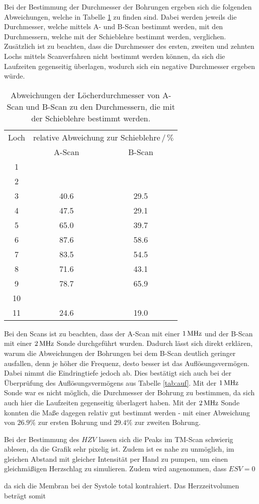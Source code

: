 Bei der Bestimmung der Durchmesser der Bohrungen ergeben sich die folgenden
Abweichungen, welche in Tabelle \ref{tab:abweichung} zu finden sind.
Dabei werden jeweils die Durchmesser, welche mittels A- und B-Scan bestimmt werden, mit den Durchmessern, welche mit der Schieblehre bestimmt werden, verglichen. Zusätzlich ist zu beachten, dass die Durchmesser des ersten, zweiten und zehnten Lochs mittels Scanverfahren nicht bestimmt werden können, da sich die Laufzeiten gegenseitig überlagen, wodurch sich ein negative Durchmesser ergeben würde.
\begin{table}
  \centering
  \begin{tabular}{c|cc}
    \toprule
    \multicolumn{1}{c|}{Loch} & \multicolumn{2}{c}{relative Abweichung zur Schieblehre$\,/\,\%$}\\
    & {A-Scan} & {B-Scan} \\
  \midrule
  1  &  \hrulefill  & \hrulefill  \\
  2  &  \hrulefill  & \hrulefill  \\
  3  &  40.6        & 29.5  \\
  4  &  47.5        & 29.1  \\
  5  &  65.0        & 39.7  \\
  6  &  87.6        & 58.6  \\
  7  &  83.5        & 54.5  \\
  8  &  71.6        & 43.1  \\
  9  &  78.7        & 65.9  \\
  10 &  \hrulefill  & \hrulefill  \\
  11 &  24.6        & 19.0  \\
  \bottomrule
  \end{tabular}
  \caption{Abweichungen der Löcherdurchmesser von A-Scan und B-Scan zu den Durchmessern, die mit der Schieblehre bestimmt werden.}
  \label{tab:abweichung}
\end{table}
Bei den Scans ist zu beachten, dass der A-Scan mit einer $1\,\si{\mega\hertz}$ und der B-Scan
mit einer $2\,\si{\mega\hertz}$ Sonde durchgeführt wurden. Dadurch lässt sich direkt erklären, warum die Abweichungen der Bohrungen bei dem B-Scan deutlich geringer ausfallen, denn je höher die Frequenz, desto besser ist das Auflösungsvermögen. Dabei nimmt die Eindringtiefe jedoch ab. Dies bestätigt sich auch bei der Überprüfung des Auflösungsvermögens aus Tabelle \ref{tab:auf}. Mit der $1\,\si{\mega\hertz}$ Sonde war es nicht möglich, die Durchmesser der Bohrung zu bestimmen, da sich auch hier die Laufzeiten gegenseitig überlagert haben. Mit der $2\,\si{\mega\hertz}$ Sonde konnten die Maße dagegen relativ gut bestimmt werden - mit einer Abweichung von $26.9\%$ zur ersten Bohrung und $29.4\%$ zur zweiten Bohrung.

Bei der Bestimmung des $HZV$ lassen sich die Peaks im TM-Scan schwierig ablesen, da die Grafik sehr pixelig ist. Zudem ist es nahe zu unmöglich, im gleichen Abstand mit gleicher Intensität per Hand zu pumpen, um einen gleichmäßigen Herzschlag zu simulieren. Zudem wird angenommen, dass $ESV = 0$

da sich die Membran bei der Systole total kontrahiert.
Das Herzzeitvolumen beträgt somit
